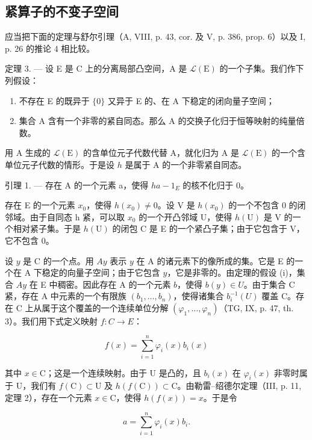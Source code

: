 \subsection{紧算子的不变子空间}

应当把下面的定理与舒尔引理（A, VIII, p. 43, cor. 及 V, p. 386, prop. 6）以及 I, p. 26 的推论 4 相比较。

定理 3. --- 设 E 是 C 上的分离局部凸空间，A 是 \(\mathcal{L}(\mathrm{E})\) 的一个子集。我们作下列假设：

\begin{enumerate}
\def\labelenumi{(\roman{enumi})}
\item
  不存在 E 的既异于 \(\{0\}\) 又异于 E 的、在 A 下稳定的闭向量子空间；
\item
  集合 A 含有一个非零的紧自同态。那么 A 的交换子化归于恒等映射的纯量倍数。
\end{enumerate}

用 A 生成的 \(\mathcal{L}(\mathrm{E})\) 的含单位元子代数代替 A，就化归为 A 是 \(\mathcal{L}(\mathrm{E})\) 的一个含单位元子代数的情形。于是设 \(h\) 是属于 A 的一个非零紧自同态。

引理 1. --- 存在 A 的一个元素 a，使得 \(ha - 1_{E}\) 的核不化归于 0。

存在 E 的一个元素 \(x_{0}\)，使得 \(h(x_{0}) \neq 0\)。设 V 是 \(h(x_{0})\) 的一个不包含 0 的闭邻域。由于自同态 h 紧，可以取 \(x_{0}\) 的一个开凸邻域 U，使得 \(h(\mathrm{U})\) 是 V 的一个相对紧子集。于是 \(h(\mathrm{U})\) 的闭包 C 是 E 的一个紧凸子集；由于它包含于 V，它不包含 0。

设 \(y\) 是 C 的一个点。用 \(Ay\) 表示 \(y\) 在 A 的诸元素下的像所成的集。它是 E 的一个在 A 下稳定的向量子空间；由于它包含 \(y\)，它是非零的。由定理的假设 (i)，集合 \(Ay\) 在 E 中稠密。因此存在 A 的一个元素 \(b\)，使得 \(b(y) \in U\)。由于集合 C 紧，存在 A 中元素的一个有限族 \((b_1, \ldots, b_n)\)，使得诸集合 \(b_i^{-1}(U)\) 覆盖 C。存在 C 上从属于这个覆盖的一个连续单位分解 \((\varphi_1, \ldots, \varphi_n)\)（TG, IX, p. 47, th. 3）。我们用下式定义映射 \(f: C \to E\)：

\[
f (x) = \sum_ {i = 1} ^ {n} \varphi_ {i} (x) b _ {i} (x)
\]

其中 \(x \in \mathrm{C}\)；这是一个连续映射。由于 U 是凸的，且 \(b_i(x)\) 在 \(\varphi_i(x)\) 非零时属于 U，我们有 \(f(\mathrm{C}) \subset \mathrm{U}\) 及 \(h(f(\mathrm{C})) \subset \mathrm{C}\)。由勒雷--绍德尔定理（III, p. 11, 定理 2），存在一个元素 \(x \in \mathrm{C}\)，使得 \(h(f(x)) = x\)。于是令

\[
a = \sum_ {i = 1} ^ {n} \varphi_ {i} (x) b _ {i}.
\]

